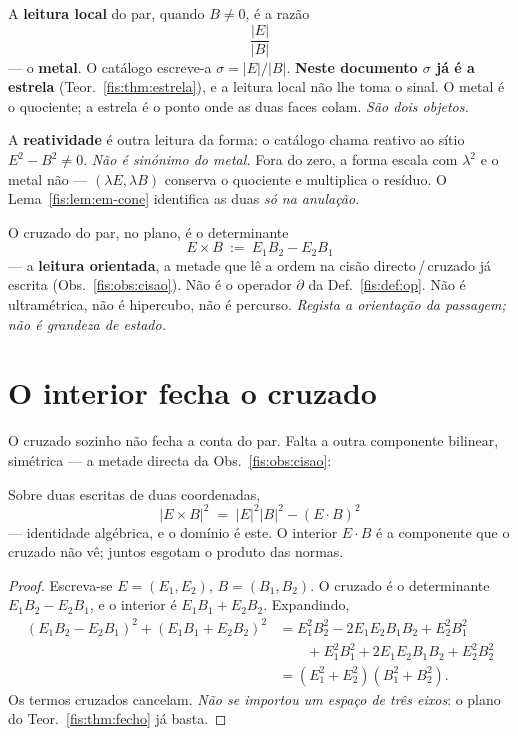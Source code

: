 \documentclass[livro.tex]{subfiles}
\begin{document}
\begin{definicao}\label{fis:def:em-metal}
A \textbf{leitura local} do par, quando $B\neq0$, é a razão
\[
\boxed{\;\frac{\lvert E\rvert}{\lvert B\rvert}\;}
\]
--- o \textbf{metal}. O catálogo escreve-a $\sigma=\lvert E\rvert/\lvert B\rvert$.
\textbf{Neste documento $\sigma$ já é a estrela} (Teor.~\ref{fis:thm:estrela}),
e a leitura local não lhe toma o sinal. O metal é o quociente; a estrela é o
ponto onde as duas faces colam. \emph{São dois objetos.}

\medskip\noindent A \textbf{reatividade} é outra leitura da forma: o catálogo
chama reativo ao sítio $E^{2}-B^{2}\neq0$. \emph{Não é sinónimo do metal.}
Fora do zero, a forma escala com $\lambda^{2}$ e o metal não ---
$(\lambda E,\lambda B)$ conserva o quociente e multiplica o resíduo. O
Lema~\ref{fis:lem:em-cone} identifica as duas \emph{só na anulação}.
\end{definicao}

\begin{definicao}\label{fis:def:em-fluxo}
O cruzado do par, no plano, é o determinante
\[
\boxed{\;E\times B\ :=\ E_{1}B_{2}-E_{2}B_{1}\;}
\]
--- a \textbf{leitura orientada}, a metade que lê a ordem na cisão
directo\,/\,cruzado já escrita (Obs.~\ref{fis:obs:cisao}). Não é o operador $\partial$ da
Def.~\ref{fis:def:op}. Não é ultramétrica, não é hipercubo, não é percurso.
\emph{Regista a orientação da passagem; não é grandeza de estado.}
\end{definicao}

\section{O interior fecha o cruzado}\label{fis:em-lagrange}

\noindent O cruzado sozinho não fecha a conta do par. Falta a outra
componente bilinear, simétrica --- a metade directa da Obs.~\ref{fis:obs:cisao}:

\begin{lema}\label{fis:lem:em-lagrange}
Sobre duas escritas de duas coordenadas,
\[
\boxed{\;\lvert E\times B\rvert^{2}\;=\;\lvert E\rvert^{2}\lvert B\rvert^{2}-(E\cdot B)^{2}\;}
\]
--- identidade algébrica, e o domínio é este. O interior $E\cdot B$ é a
componente que o cruzado não vê; juntos esgotam o produto das normas.
\end{lema}

\begin{proof}
Escreva-se $E=(E_{1},E_{2})$, $B=(B_{1},B_{2})$. O cruzado é o determinante
$E_{1}B_{2}-E_{2}B_{1}$, e o interior é $E_{1}B_{1}+E_{2}B_{2}$. Expandindo,
\begin{align*}
(E_{1}B_{2}-E_{2}B_{1})^{2}+(E_{1}B_{1}+E_{2}B_{2})^{2}
&=E_{1}^{2}B_{2}^{2}-2E_{1}E_{2}B_{1}B_{2}+E_{2}^{2}B_{1}^{2}\\
&\qquad+E_{1}^{2}B_{1}^{2}+2E_{1}E_{2}B_{1}B_{2}+E_{2}^{2}B_{2}^{2}\\
&=(E_{1}^{2}+E_{2}^{2})(B_{1}^{2}+B_{2}^{2}).
\end{align*}
Os termos cruzados cancelam. \emph{Não se importou um espaço de três eixos}:
o plano do Teor.~\ref{fis:thm:fecho} já basta.
\end{proof}
\end{document}
